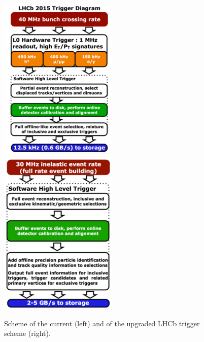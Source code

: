 \begin{figure}[h]
\centerline{
 \includegraphics[width=0.5\textwidth]{figures/Trigger2015.pdf}\\
\includegraphics[width=0.5\textwidth]{figures/TriggerUpgrade.pdf}	}
  \caption{Scheme of the current (left) and of the upgraded LHCb trigger scheme (right).}
  \label{fig:ulhcb_trigger}
\end{figure}

